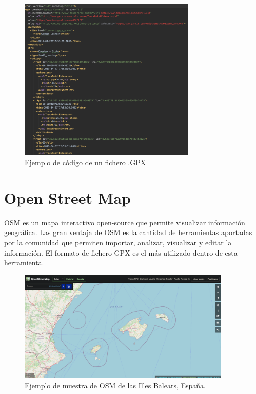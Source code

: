 \begin{figure}[htb]
\begin{center}
\includegraphics[width=0.75\textwidth]{./Imagenes/GPXExample.png}
\caption{Ejemplo de código de un fichero .\ac{GPX}}
\label{fig:PointGeneration02}
\end{center}
\end{figure}



\newpage

\section{Open Street Map}
\ac{OSM} es un mapa interactivo open-source que permite visualizar información geográfica. Las gran ventaja 
de \ac{OSM} es la cantidad de herramientas aportadas por la comunidad que permiten importar, analizar, 
visualizar y editar la información. El formato de fichero \ac{GPX} es el más utilizado dentro de esta herramienta. 

\begin{figure}[htb]
\begin{center}
\includegraphics[width=0.9\textwidth]{./Imagenes/OSMExample.png}
\caption{Ejemplo de muestra de OSM de las Illes Balears, España.}
\label{OSMExample}
\end{center}
\end{figure}



